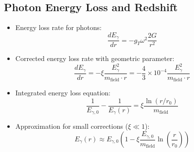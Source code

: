 \documentclass[12pt,a4paper]{article}
\begin{document}
\subsection{Photon Energy Loss and Redshift}
\begin{itemize}
	\item Energy loss rate for photons:
	\begin{equation}
		\frac{dE_\gamma}{dr} = -g_T \omega^2 \frac{2G}{r^2}
	\end{equation}
	
	\item Corrected energy loss rate with geometric parameter:
	\begin{equation}
		\boxed{\frac{dE_\gamma}{dr} = -\xi \frac{E_\gamma^2}{m_{\text{field}} \cdot r} = -\frac{4}{3} \times 10^{-4} \frac{E_\gamma^2}{m_{\text{field}} \cdot r}}
	\end{equation}
	
	\item Integrated energy loss equation:
	\begin{equation}
		\frac{1}{E_{\gamma,0}} - \frac{1}{E_\gamma(r)} = \xi \frac{\ln(r/r_0)}{m_{\text{field}}}
	\end{equation}
	
	\item Approximation for small corrections ($\xi \ll 1$):
	\begin{equation}
		E_\gamma(r) \approx E_{\gamma,0} \left(1 - \xi \frac{E_{\gamma,0}}{m_{\text{field}}} \ln\left(\frac{r}{r_0}\right)\right)
	\end{equation}
\end{itemize}
\end{document}
